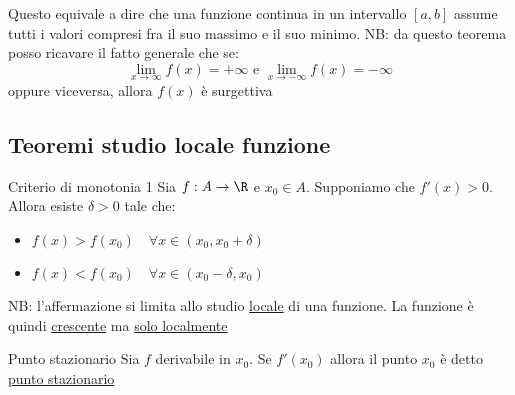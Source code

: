 Questo equivale a dire che una funzione continua in un intervallo $ \left[ a,b \right]  $ assume tutti i valori compresi fra il suo massimo e il suo minimo. NB: da questo teorema posso ricavare il fatto generale che se:
\[
	\lim_{x \to \infty} f(x) = + \infty \text{ e } \lim_{x \to -\infty} f(x) = -\infty
\]
oppure viceversa, allora $ f\left( x \right)  $ è surgettiva
\subsection{Teoremi studio locale funzione}
\begin{teorema}{Criterio di monotonia 1}
	Sia $  f: A \to \R  $ e $ x_0 \in  A $. Supponiamo che $ f'\left( x \right) > 0 $. Allora esiste $ \delta >0 $ tale che:
	\begin{itemize}
		\item $ f\left( x \right)  > f\left( x_0 \right) \quad  \forall x \in  \left( x_0 , x_0+ \delta   \right)  $
		\item $ f\left( x \right)  < f\left( x_0 \right) \quad  \forall x \in  \left( x_0- \delta , x_0  \right)  $
	\end{itemize}
\end{teorema}

NB: l'affermazione si limita allo studio \underline{locale} di una funzione. La funzione è quindi \underline{crescente} ma \underline{solo localmente}
\begin{definizione}{Punto stazionario}
	Sia $ f $ derivabile in $ x_0 $. Se $ f'\left( x_0 \right)  $ allora il punto $ x_0 $ è detto \underline{ punto stazionario}
\end{definizione}

